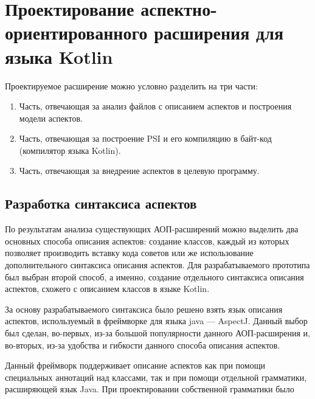 \chapter{Проектирование аспектно-ориентированного расширения для языка Kotlin}
\label{cha:extension_design}
Проектируемое расширение можно условно разделить на три части:
\begin{enumerate}
	\item Часть, отвечающая за анализ файлов с описанием аспектов и построения
		модели аспектов.
	\item Часть, отвечающая за построение PSI и его компиляцию в байт-код (компилятор языка Kotlin).
	\item Часть, отвечающая за внедрение аспектов в целевую программу.
\end{enumerate}
\section{Разработка синтаксиса аспектов}
\label{sec:aspect_syntax_design}
По результатам анализа существующих АОП-расширений можно выделить два основных
способа описания аспектов: создание классов, каждый из которых позволяет
производить вставку кода советов или же использование дополнительного синтаксиса
описания аспектов.
Для разрабатываемого прототипа был выбран второй способ, а именно, создание
отдельного синтаксиса описания аспектов, схожего с описанием классов в языке
Kotlin.

За основу разрабатываемого синтаксиса было решено взять язык описания аспектов,
используемый в фреймворке для языка java --- AspectJ.
Данный выбор был сделан, во-первых, из-за большой популярности данного
АОП-расширения и, во-вторых, из-за удобства и гибкости данного способа описания
аспектов.

Данный фреймворк поддерживает описание аспектов как при помощи специальных аннотаций над классами, так и при помощи отдельной грамматики, расширяющей язык Java.
При проектировании собственной грамматики было 
